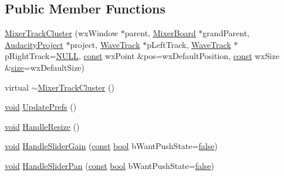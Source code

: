 \subsection*{Public Member Functions}
\begin{DoxyCompactItemize}
\item 
\hyperlink{class_mixer_track_cluster_a8afe056ea42bf3ea1f051e641f69f691}{Mixer\+Track\+Cluster} (wx\+Window $\ast$parent, \hyperlink{class_mixer_board}{Mixer\+Board} $\ast$grand\+Parent, \hyperlink{class_audacity_project}{Audacity\+Project} $\ast$project, \hyperlink{class_wave_track}{Wave\+Track} $\ast$p\+Left\+Track, \hyperlink{class_wave_track}{Wave\+Track} $\ast$p\+Right\+Track=\hyperlink{px__mixer_8h_a070d2ce7b6bb7e5c05602aa8c308d0c4}{N\+U\+LL}, \hyperlink{getopt1_8c_a2c212835823e3c54a8ab6d95c652660e}{const} wx\+Point \&pos=wx\+Default\+Position, \hyperlink{getopt1_8c_a2c212835823e3c54a8ab6d95c652660e}{const} wx\+Size \&\hyperlink{group__lavu__mem_ga854352f53b148adc24983a58a1866d66}{size}=wx\+Default\+Size)
\item 
virtual \hyperlink{class_mixer_track_cluster_addf6ffcc9d440aac9dd627e57ff5494b}{$\sim$\+Mixer\+Track\+Cluster} ()
\item 
\hyperlink{sound_8c_ae35f5844602719cf66324f4de2a658b3}{void} \hyperlink{class_mixer_track_cluster_a98b201a8f3adc5ef5c747498c7e8f4cb}{Update\+Prefs} ()
\item 
\hyperlink{sound_8c_ae35f5844602719cf66324f4de2a658b3}{void} \hyperlink{class_mixer_track_cluster_a317d98ff2f4e68525a75bc5d7f20882b}{Handle\+Resize} ()
\item 
\hyperlink{sound_8c_ae35f5844602719cf66324f4de2a658b3}{void} \hyperlink{class_mixer_track_cluster_a35f7c0a5591debf3af6330129a44a7ac}{Handle\+Slider\+Gain} (\hyperlink{getopt1_8c_a2c212835823e3c54a8ab6d95c652660e}{const} \hyperlink{mac_2config_2i386_2lib-src_2libsoxr_2soxr-config_8h_abb452686968e48b67397da5f97445f5b}{bool} b\+Want\+Push\+State=\hyperlink{mac_2config_2i386_2lib-src_2libsoxr_2soxr-config_8h_a65e9886d74aaee76545e83dd09011727}{false})
\item 
\hyperlink{sound_8c_ae35f5844602719cf66324f4de2a658b3}{void} \hyperlink{class_mixer_track_cluster_af43ffa2b18afd972a5a10e09fab6ab61}{Handle\+Slider\+Pan} (\hyperlink{getopt1_8c_a2c212835823e3c54a8ab6d95c652660e}{const} \hyperlink{mac_2config_2i386_2lib-src_2libsoxr_2soxr-config_8h_abb452686968e48b67397da5f97445f5b}{bool} b\+Want\+Push\+State=\hyperlink{mac_2config_2i386_2lib-src_2libsoxr_2soxr-config_8h_a65e9886d74aaee76545e83dd09011727}{false})
\item 

\end{DoxyCompactItemize}
